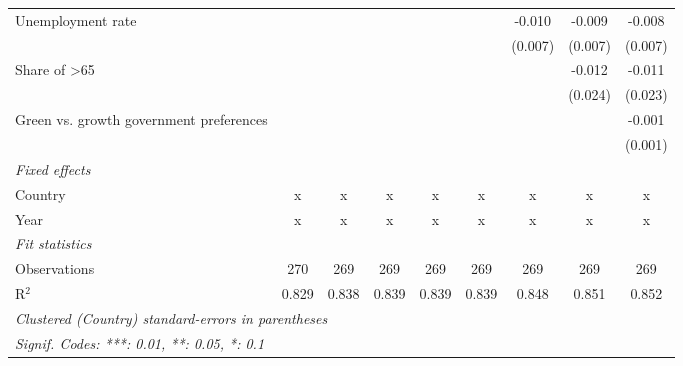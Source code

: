 \begin{table}[htbp]
\begin{tabular}{lcccccccc}
      Unemployment rate                                             &         &         &         &         &         & -0.010  & -0.009  & -0.008\\   
                                                                    &         &         &         &         &         & (0.007) & (0.007) & (0.007)\\   
      Share of >65                                                  &         &         &         &         &         &         & -0.012  & -0.011\\   
                                                                    &         &         &         &         &         &         & (0.024) & (0.023)\\   
      Green vs. growth government preferences                       &         &         &         &         &         &         &         & -0.001\\   
                                                                    &         &         &         &         &         &         &         & (0.001)\\   
      \emph{Fixed effects}\\
      Country                                                       & x       & x       & x       & x       & x       & x       & x       & x\\  
      Year                                                          & x       & x       & x       & x       & x       & x       & x       & x\\  
      \midrule \emph{Fit statistics}\\
      Observations                                                  & 270     & 269     & 269     & 269     & 269     & 269     & 269     & 269\\  
      R$^2$                                                         & 0.829   & 0.838   & 0.839   & 0.839   & 0.839   & 0.848   & 0.851   & 0.852\\  
      \midrule
      \multicolumn{9}{l}{\emph{Clustered (Country) standard-errors in parentheses}}\\
      \multicolumn{9}{l}{\emph{Signif. Codes: ***: 0.01, **: 0.05, *: 0.1}}\\
   \end{tabular}
\end{table}


